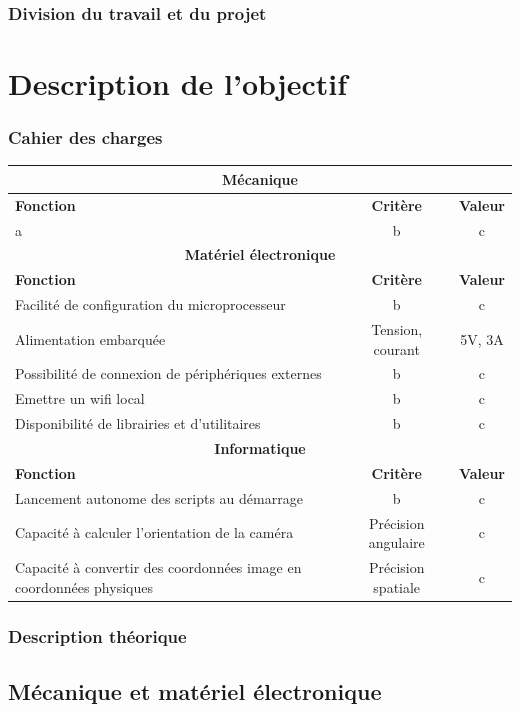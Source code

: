 \documentclass{article}
\begin{document}
\section{Division du travail et du projet}

\newpage
\part{Description de l'objectif}
\section{Cahier des charges}

\begin{tabular}{|l|c|c|}
\hline
\multicolumn{3}{|c|}{\bf \LARGE{Mécanique}}\\
\hline
\bf Fonction & \bf Critère & \bf Valeur\\
\hline
a & b & c\\
\hline
\hline
\multicolumn{3}{|c|}{\bf \LARGE{Matériel électronique}}\\
\hline
\bf Fonction & \bf Critère & \bf Valeur\\
\hline
Facilité de configuration du microprocesseur & b & c\\
\hline
Alimentation embarquée & Tension, courant & 5V, 3A\\
\hline
Possibilité de connexion de périphériques externes & b & c\\
\hline
Emettre un wifi local & b & c\\
\hline
Disponibilité de librairies et d'utilitaires & b & c\\
\hline
\hline
\multicolumn{3}{|c|}{\bf \LARGE{Informatique}}\\
\hline
\bf Fonction & \bf Critère & \bf Valeur\\
\hline
Lancement autonome des scripts au démarrage & b & c\\
\hline
Capacité à calculer l'orientation de la caméra & Précision angulaire & c\\
\hline
Capacité à convertir des coordonnées image en coordonnées physiques & Précision spatiale & c\\
\hline
\end{tabular}

\section{Description théorique}


\chapter{\bf \LARGE{Mécanique et matériel électronique}}
\end{document}
